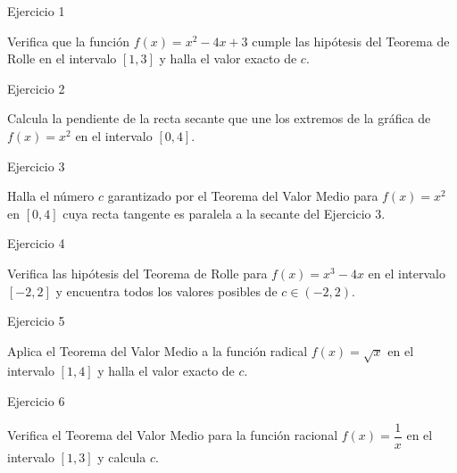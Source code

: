\documentclass[aspectratio=169]{beamer}
\begin{document}
\begin{frame}{Ejercicio 1}
  \begin{mwejercicio}
    Verifica que la función $f(x) = x^2 - 4x + 3$ cumple las hipótesis del Teorema de Rolle en el intervalo $[1, 3]$ y halla el valor exacto de $c$.
  \end{mwejercicio}
  \vspace{3.5cm}
\end{frame}
\begin{frame}{Ejercicio 2}
  \begin{mwejercicio}
    Calcula la pendiente de la recta secante que une los extremos de la gráfica de $f(x) = x^2$ en el intervalo $[0, 4]$.
  \end{mwejercicio}
  \vspace{3.5cm}
\end{frame}
\begin{frame}{Ejercicio 3}
  \begin{mwejercicio}
    Halla el número $c$ garantizado por el Teorema del Valor Medio para $f(x) = x^2$ en $[0, 4]$ cuya recta tangente es paralela a la secante del Ejercicio 3.
  \end{mwejercicio}
  \vspace{3.5cm}
\end{frame}
\begin{frame}{Ejercicio 4}
  \begin{mwejercicio}
    Verifica las hipótesis del Teorema de Rolle para $f(x) = x^3 - 4x$ en el intervalo $[-2, 2]$ y encuentra todos los valores posibles de $c \in (-2, 2)$.
  \end{mwejercicio}
  \vspace{3.5cm}
\end{frame}
\begin{frame}{Ejercicio 5}
  \begin{mwejercicio}
    Aplica el Teorema del Valor Medio a la función radical $f(x) = \sqrt{x}$ en el intervalo $[1, 4]$ y halla el valor exacto de $c$.
  \end{mwejercicio}
  \vspace{3.5cm}
\end{frame}
\begin{frame}{Ejercicio 6}
  \begin{mwejercicio}
    Verifica el Teorema del Valor Medio para la función racional $f(x) = \dfrac{1}{x}$ en el intervalo $[1, 3]$ y calcula $c$.
  \end{mwejercicio}
  \vspace{3.5cm}
\end{frame}
\end{document}
